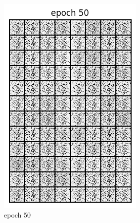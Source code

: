 \documentclass[a4paper]{article}
\theoremstyle{definition}
\begin{document}
\begin{enumerate} [label=(\alph*)]
\begin{figure}[H]
\begin{subfigure}[b]{0.3\textwidth}
				\includegraphics[width=\textwidth]{gan_q1b_epoch50.png}
				\caption{epoch 50}
			\end{subfigure}
			\hfill
			\begin{subfigure}[b]{0.3\textwidth}
				\centering

\end{subfigure}
\end{figure}
\end{enumerate}
\end{document}
